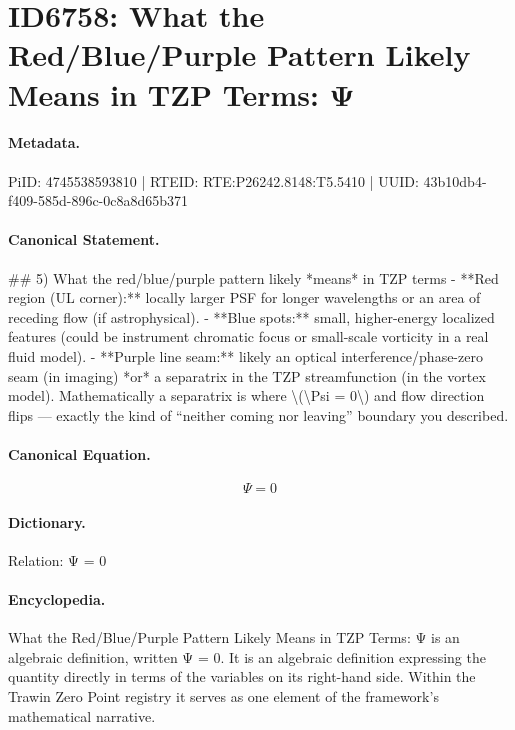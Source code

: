 \section*{ID6758: What the Red/Blue/Purple Pattern Likely Means in TZP Terms: Ψ}
\paragraph{Metadata.}
PiID: 4745538593810 | RTEID: RTE:P26242.8148:T5.5410 | UUID: 43b10db4-f409-585d-896c-0c8a8d65b371

\paragraph{Canonical Statement.}
\#\# 5) What the red/blue/purple pattern likely *means* in TZP terms - **Red region (UL corner):** locally larger PSF for longer wavelengths or an area of receding flow (if astrophysical). - **Blue spots:** small, higher-energy localized features (could be instrument chromatic focus or small-scale vorticity in a real fluid model). - **Purple line seam:** likely an optical interference/phase-zero seam (in imaging) *or* a separatrix in the TZP streamfunction (in the vortex model). Mathematically a separatrix is where \textbackslash{}(\textbackslash{}Psi = 0\textbackslash{}) and flow direction flips — exactly the kind of “neither coming nor leaving” boundary you described.

\paragraph{Canonical Equation.}
\[
\Psi = 0
\]

\paragraph{Dictionary.}
Relation: Ψ = 0

\paragraph{Encyclopedia.}
What the Red/Blue/Purple Pattern Likely Means in TZP Terms: Ψ is an algebraic definition, written Ψ = 0. It is an algebraic definition expressing the quantity directly in terms of the variables on its right-hand side. Within the Trawin Zero Point registry it serves as one element of the framework's mathematical narrative.
